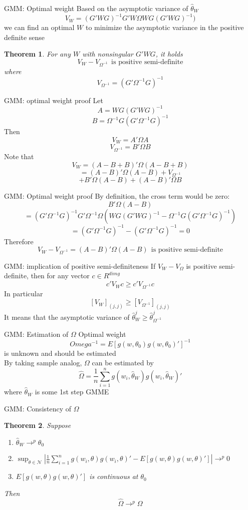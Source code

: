 \documentclass{beamer}
\newtheorem{thm}{Theorem}[subsection]
\begin{document}
\begin{frame}{GMM: Optimal weight}
	Based on the asymptotic variance of $\hat{\theta}_W$
\[V_W = (G'WG)^{-1} G'W\Omega WG(G'WG)^{-1})\]
we can find an optimal $W$ to minimize the asymptotic variance in the positive definite sense
\begin{thm}
	For any $W$ with nonsingular $G'WG$, it holds 
	\[V_W - V_{\Omega^{-1}} \ \ \text{is positive semi-definite}\]
	where
	\[V_{\Omega^{-1}} = (G'\Omega^{-1}G)^{-1}\]
\end{thm}
\end{frame}
\begin{frame}{GMM: optimal weight proof}
	Let 
	\[A = WG(G'WG)^{-1}\]
	\[B = \Omega^{-1} G(G' \Omega^{-1} G)^{-1}\]
	Then
	\[V_W = A' \Omega A\]
	\[V_{\Omega^{-1}} = B' \Omega B\]
	Note that
	\[V_W = (A-B+B)' \Omega(A-B+B)\]
	\[= (A-B)' \Omega (A-B) + V_{\Omega^{-1}}\]
	\[+B'\Omega(A-B) + (A-B)' \Omega B\]
\end{frame}
\begin{frame}{GMM: Optimal weight proof}
	By definition, the cross term would be zero:
	\[B' \Omega (A - B)\]
	\[= (G' \Omega^{-1} G)^{-1} G' \Omega^{-1} \Omega (WG(G'WG)^{-1} - \Omega^{-1} G(G' \Omega^{-1} G)^{-1})\]
	\[=(G' \Omega^{-1} G)^{-1} - (G' \Omega^{-1} G)^{-1} = 0\]
	Therefore
	\[V_W - V_{\Omega^{-1}} = (A-B)' \Omega (A-B) \ \ \text{is positive semi-definite}\]
\end{frame}
\begin{frame}{GMM: implication of positive semi-definiteness}
	If $V_W - V_{\Omega}$ is positive semi-definite, then for any vector $c \in R^{dim g}$
	\[c'V_Wc \geq c'V_{\Omega^{-1}} c\]
	In particular
	\[[V_W]_{(j,j)} \geq [V_{\Omega^{-1}}]_{(j,j)}\]
	It means that the asymptotic variance of $\hat{\theta}^j_W \geq \hat{\theta}^j_{\Omega^{-1}}$
\end{frame}
\begin{frame}{GMM: Estimation of $\Omega$}
	Optimal weight
	\[Omega^{-1} = E[g(w,\theta_0)g(w,\theta_0)']^{-1}\]
	is unknown and should be estimated  \\
	By taking sample analog, $\Omega$ can be estimated by 
	\[\hat{\Omega} = \frac{1}{n} \sum^n_{i=1} g(w_i, \hat{\theta}_W)g(w_i,\hat{\theta}_W)'\]
	where $\hat{\theta}_W$ is some 1st step GMME
\end{frame}
\begin{frame}{GMM: Consistency of $\Omega$}
	\begin{thm}
		Suppose
		\begin{enumerate}
			\item $\hat{\theta}_W \rightarrow^p \theta_0$
			\item $\sup_{\theta \in \mathcal{N}} |\frac{1}{n} \sum^n_{i=1} g(w_i,\theta) g(w_i, \theta)' - E[g(w,\theta) g(w,\theta)']| \rightarrow^p 0$
			\item $E[g(w,\theta)g(w,\theta)']$ is continuous at $\theta_0$
		\end{enumerate}
		Then
		\[\hat{\Omega} \rightarrow^p \Omega\]
	\end{thm}
\end{frame}
\end{document}

